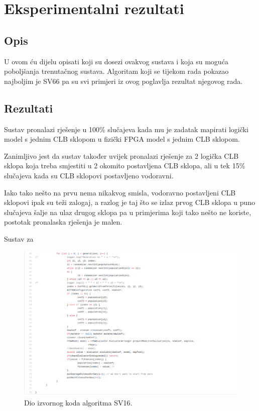 \documentclass[times, utf8, zavrsni]{fer}
\begin{document}
\chapter{Eksperimentalni rezultati}

\section{Opis}

U ovom ću dijelu opisati koji su dosezi ovakvog sustava i koja su moguća poboljšanja trenutačnog sustava. Algoritam koji se tijekom rada pokazao najboljim je SV66 pa su svi primjeri iz ovog poglavlja rezultat njegovog rada. 

\section{Rezultati}

Sustav pronalazi rješenje u 100\% slučajeva kada mu je zadatak mapirati logički model s jednim CLB sklopom u fizički FPGA model s jednim CLB sklopom.



Zanimljivo jest da sustav također uvijek pronalazi rješenje za 2 logička CLB sklopa koja treba smjestiti u 2 okomito postavljena CLB sklopa, ali u tek 15\% slučajeva kada su CLB sklopovi postavljeno vodoravni. 


Iako tako nešto na prvu nema nikakvog smisla, vodoravno postavljeni CLB sklopovi ipak su teži zalogaj, a razlog je taj što se izlaz prvog CLB sklopa u puno slučajeva šalje na ulaz drugog sklopa pa u primjerima koji tako nešto ne koriste, postotak pronalaska rješenja je malen.




Sustav za





\begin{figure}[H]
	\centering
	\includegraphics[width=18cm]{slike/srcAlg.png}
	\caption{Dio izvornog koda algoritma SV16.}
	\label{fig:sv16-src}
\end{figure} 
\end{document}
